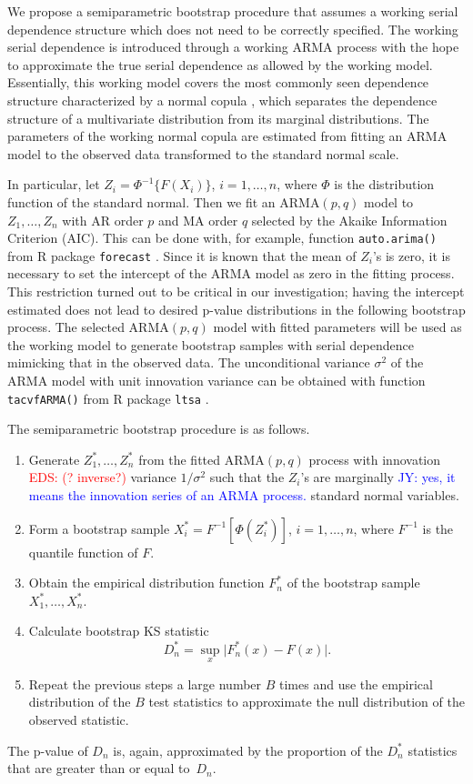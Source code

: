 \documentclass[12pt, letterpaper, titlepage]{article}
\newcommand{\jy}[1]{\textcolor{blue}{JY: #1}}
\newcommand{\eds}[1]{\textcolor{red}{EDS: (#1)}}
\begin{document}
We propose a semiparametric bootstrap procedure that assumes a working serial
dependence structure which does not need to be correctly specified. The working
serial dependence is introduced through a working ARMA process with the hope to
approximate the true serial dependence as allowed by the working
model. Essentially, this working model covers the most commonly seen dependence
structure characterized by a normal copula \citep{hofert2018elements}, which
separates the dependence structure
of a multivariate distribution from its marginal distributions. 
The parameters of the working normal copula are
estimated from fitting an ARMA model to the
observed data transformed to the standard normal scale.


In particular, let
$Z_i = \Phi^{-1}\{ F(X_i)\}$, $i = 1, \ldots, n$, where $\Phi$ is the distribution
function of the standard normal. Then we fit an ARMA$(p, q)$ model to
$Z_1, \ldots, Z_n$ with AR order $p$ and MA order $q$ selected by the Akaike
Information Criterion (AIC). This can be done with, for example, function
\texttt{auto.arima()} from  R package \texttt{forecast}
\citep{hyndman2008automatic}. Since it is known that the mean of $Z_i$'s is
zero, it is necessary to set the intercept of the ARMA model as zero in the
fitting process. This restriction turned out to be critical in our
investigation; having the intercept estimated does not lead to desired p-value
distributions in the following bootstrap process.
The selected ARMA$(p, q)$ model with fitted
parameters will be used as the working model to generate bootstrap samples with
serial dependence mimicking that in the observed data. The unconditional
variance $\sigma^2$ of the ARMA model with unit innovation variance can be
obtained with function
\texttt{tacvfARMA()} from R package \texttt{ltsa} \citep{mcleod2007algorithms}.


The semiparametric bootstrap procedure is as follows.
\begin{enumerate}
\item
  Generate $Z_1^*, \ldots, Z_n^*$ from the fitted ARMA$(p, q)$ process with
  innovation \eds{? inverse?} variance $1 / \sigma^2$ such that the $Z_i$'s are
	marginally \jy{yes, it means the innovation series of an ARMA process.}
  standard normal variables.
\item
  Form a bootstrap sample $X_i^* = F^{-1} [\Phi(Z_i^*)]$,  $i = 1, \ldots, n$,
  where $F^{-1}$ is the quantile function of $F$.
\item
  Obtain the empirical distribution function $F_n^*$ of the bootstrap sample
  $X_1^*, \ldots, X_n^*$.
\item
  Calculate bootstrap KS statistic
  \[
    D_n^* = \sup_x \lvert F_n^* (x)- F(x) \rvert.
  \]
\item
  Repeat the previous steps a large number $B$ times and use the empirical
  distribution of the $B$ test statistics to approximate
  the null distribution of the observed statistic.
\end{enumerate}
The p-value of $D_n$ is, again, approximated by the proportion of the $D_n^*$
statistics that are greater than or equal to~$D_n$. 
\end{document}
